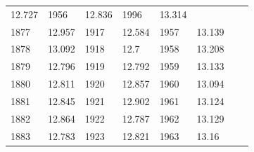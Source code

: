 \begin{description}[noitemsep]
\begin{description}[noitemsep]
\begin{table}
\begin{center}
\begin{xtabular}[t]{|l|l|l|l|l|l|l|l|}
        	12.727	 &
        	1956	 &
        	12.836	 &
        	1996	 &
        	13.314	%
     \tabularnewline{}
        	1877	 &
        	12.957	 &
        	1917	 &
        	12.584	 &
        	1957	 &
        	13.139	 &
        		 &
     \tabularnewline{}
        	1878	 &
        	13.092	 &
        	1918	 &
        	12.7	 &
        	1958	 &
        	13.208	 &
        		 &
     \tabularnewline{}
        	1879	 &
        	12.796	 &
        	1919	 &
        	12.792	 &
        	1959	 &
        	13.133	 &
        		 &
     \tabularnewline{}
        	1880	 &
        	12.811	 &
        	1920	 &
        	12.857	 &
        	1960	 &
        	13.094	 &
        		 &
     \tabularnewline{}
        	1881	 &
        	12.845	 &
        	1921	 &
        	12.902	 &
        	1961	 &
        	13.124	 &
        		 &
     \tabularnewline{}
        	1882	 &
        	12.864	 &
        	1922	 &
        	12.787	 &
        	1962	 &
        	13.129	 &
        		 &
     \tabularnewline{}
        	1883	 &
        	12.783	 &
        	1923	 &
        	12.821	 &
        	1963	 &
        	13.16	 &
        		 &
     \tabularnewline{}

\end{xtabular}
\end{center}
\end{table}
\end{description}
\end{description}
